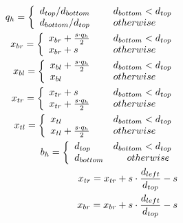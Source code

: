\begin{align}
q_h = \left\{ 
	 \begin{array}{ll}
	 {d_{top}}/{d_{bottom}} &\mbox{\hspace{0.5cm}} d_{bottom}<d_{top}\\
	 {d_{bottom}}/{d_{top}} &\mbox{\hspace{0.5cm}} otherwise
	 \end{array} 
\right.\label{eq:points_qh}\\
x_{br}=\left\{ 
	 \begin{array}{ll}
	 {x_{br} + \frac{s\cdot q_h}{2}} &\mbox{\hspace{0.5cm}} d_{bottom}<d_{top}\\
	 {x_{br}} + s &\mbox{\hspace{0.5cm}} otherwise
	 \end{array}\right.\label{eq:points_br_x}\\
x_{bl}=\left\{ 
	 \begin{array}{ll}
	 {x_{bl} + \frac{s\cdot q_h}{2}} &\mbox{\hspace{0.5cm}} d_{bottom}<d_{top}\\
	 {x_{bl}} &\mbox{\hspace{0.5cm}} otherwise
	 \end{array}\right.\label{eq:points_bl_x}\\
x_{tr}=\left\{ 
	 \begin{array}{ll}
	 {x_{tr}} + s &\mbox{\hspace{0.5cm}} d_{bottom}<d_{top}\\
	 {x_{tr} + \frac{s\cdot q_h}{2}} &\mbox{\hspace{0.5cm}} otherwise
	 \end{array}\right.\label{eq:points_tr_x}\\
x_{tl}=\left\{ 
	 \begin{array}{ll}
	 {x_{tl}} &\mbox{\hspace{0.5cm}} d_{bottom}<d_{top}\\
	 {x_{tl} + \frac{s\cdot q_h}{2}} &\mbox{\hspace{0.5cm}} otherwise
	 \end{array}\right.\label{eq:points_tl_x}\\
b_h    =\left\{ 
	 \begin{array}{ll}
	 d_{top} &d_{bottom}<d_{top}\\
	 d_{bottom} &\mbox{\hspace{0.5cm}} otherwise
	 \end{array}\right.\label{eq:points_bv}\\
 x_{tr} = x_{tr} + s \cdot \frac{d_{left}}{d_{top}} - s\label{eq:points_tr_x_2}\\
 x_{br} = x_{br} + s \cdot \frac{d_{left}}{d_{top}} - s\label{eq:points_br_x_2}
\end{align}  

